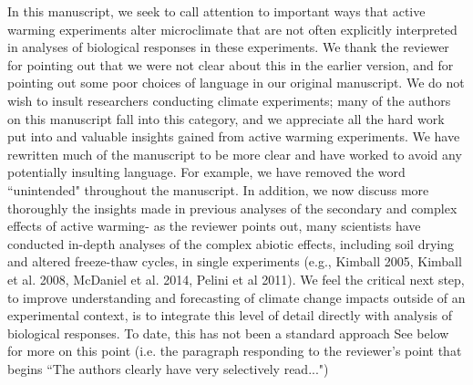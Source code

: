 \documentclass[11pt,a4paper]{letter}
\begin{document}
In this manuscript, we seek to call attention to important ways that active warming experiments alter microclimate that are not often explicitly interpreted in analyses of biological responses in these experiments. We thank the reviewer for pointing out that we were not clear about this in the earlier version, and for pointing out some poor choices of language in our original manuscript. We do not wish to insult researchers conducting climate experiments; many of the authors on this manuscript fall into this category, and we appreciate all the hard work put into and valuable insights gained from active warming experiments. We have rewritten much of the manuscript to be more clear and have worked to avoid any potentially insulting language. For example, we have removed the word ``unintended" throughout the manuscript. In addition, we now discuss more thoroughly the insights made in previous analyses of the secondary and complex effects of active warming- as the reviewer points out, many scientists have conducted in-depth analyses of the complex abiotic effects, including soil drying and altered freeze-thaw cycles, in single experiments (e.g., Kimball 2005, Kimball et al. 2008, McDaniel et al. 2014, Pelini et al 2011). We feel the critical next step, to improve understanding and  forecasting of climate change impacts outside of an experimental context, is to integrate this level of detail directly with analysis of biological responses. To date, this has not been a standard approach See below for more on this point (i.e. the paragraph responding to the reviewer's point that begins ``The authors clearly have very selectively read...")
\end{document}
